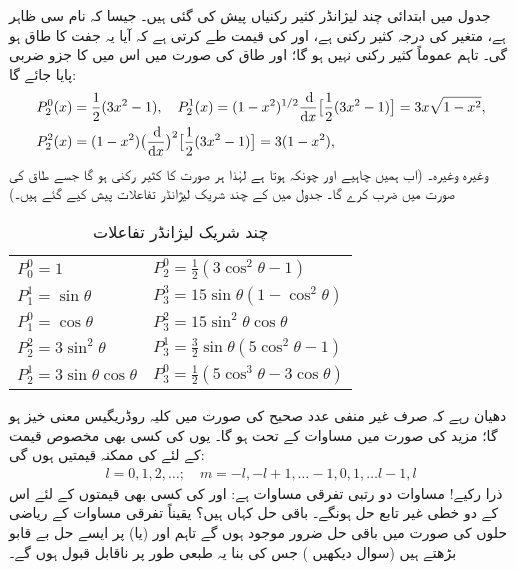 جدول  میں ابتدائی چند لیژانڈر کثیر رکنیاں پیش کی گئی ہیں۔ جیسا کہ نام سی ظاہر ہے،  متغیر  کی درجہ  کثیر رکنی ہے، اور  کی قیمت طے  کرتی ہے کہ آیا یہ جفت کا طاق ہو گی۔ تاہم    عموماً کثیر رکنی نہیں ہو گا؛ اور طاق  کی صورت میں اس میں  کا جزو ضربی پایا جائے گا:
\begin{align*}
P_{2}^{0}(x)&=\frac{1}{2}(3x^{2}-1), \quad P_{2}^{1}(x)=(1-x^{2})^{1/2}\frac{\dif}{\dif{x}}\big[\frac{1}{2}(3x^{2}-1)\big]=3x\sqrt{1-x^{2}}, \\
P_{2}^{2}(x)&=(1-x^{2})\big(\frac{\dif}{\dif{x}}\big)^{2}\big[\frac{1}{2}(3x^{2}-1)\big]=3(1-x^{2}),
\end{align*}
وغیرہ وغیرہ۔  (اب ہمیں  چاہیے اور چونکہ  ہوتا ہے لہٰذا  ہر صورت  کا کثیر رکنی ہو گا جسے طاق  کی صورت میں
  ضرب کرے گا۔ جدول  میں  کے چند شریک لیژانڈر تفاعلات پیش کیے گئے ہیں۔)
\begin{table}
\caption{چند شریک لیژانڈر تفاعلات }
\label{جدول_ابعادی_شریک_لیژانڈر_تفاعلات}
\centering
\begin{tabular}{ll}
$P_0^0=1$ & $P_2^0=\frac{1}{2}(3\cos^2\theta-1)$\\[0.25em]
$P_1^1=\sin\theta$ & $P_3^3=15\sin\theta(1-\cos^2\theta)$\\[0.25em]
$P_1^0=\cos\theta$ & $P_3^2=15\sin^2\theta\cos\theta$\\[0.25em]
$P_2^2=3\sin^2\theta$ & $P_3^1=\frac{3}{2}\sin\theta(5\cos^2\theta-1)$\\[0.25em]
$P_2^1=3\sin\theta\cos\theta$ & $P_3^0=\frac{1}{2}(5\cos^3\theta-3\cos\theta)$
\end{tabular}
\end{table}

دھیان رہے کہ صرف غیر منفی عدد صحیح  کی صورت میں کلیہ روڈریگیس معنی خیز ہو گا؛ مزید  کی صورت میں مساوات  کے تحت  ہو گا۔ یوں  کی کسی بھی مخصوص قیمت کے لئے  کی  ممکنہ قیمتیں ہوں گی:
\begin{align}\label{مساوات_ابعادی_انحطاطی_قیمتیں}
l=0,1,2,\dotsc;\quad m=-l,-l+1,\dotsc-1,0,1,\dotsc l-1,l
\end{align}
ذرا رکیے! مساوات   دو رتبی تفرقی مساوات ہے:   اور  کی کسی بھی قیمتوں کے لئے اس کے  دو خطی غیر تابع حل ہونگے۔ باقی حل کہاں ہیں؟  یقیناً  تفرقی مساوات کے ریاضی حلوں کی  صورت میں باقی حل ضرور موجود ہوں گے تاہم   اور (یا)  پر ایسے حل بے قابو بڑھتے ہیں (سوال  دیکھیں ) جس کی بنا   یہ طبعی طور  پر ناقابل قبول ہوں گے۔ 

